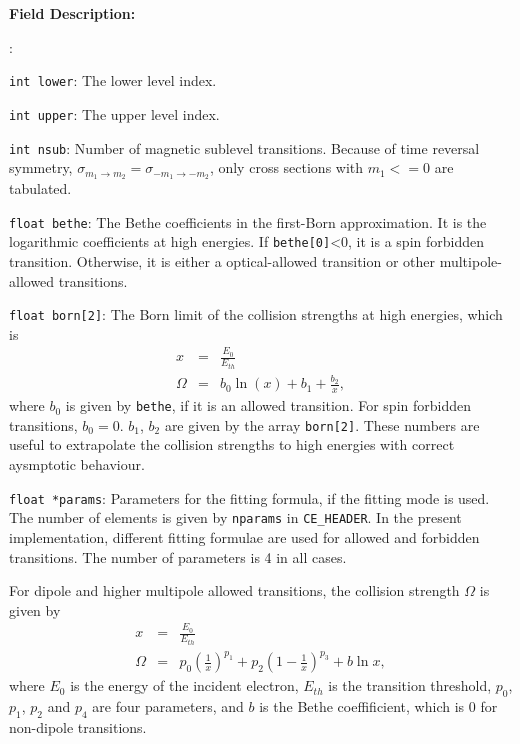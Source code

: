 \documentclass[twoside,letterpaper]{refrep}
\newenvironment{dbdesc}{\textbf{Field Description:} \begin{list}
	{:}{\setlength{\labelwidth}{2in}
	   \setlength{\leftmargin}{2in}
	   \setlength{\labelsep}{0.1in}
	   \setlength{\rightmargin}{0.2in}}}
	{\end{list}}
\begin{document}
\begin{dbdesc}
\item[\texttt{int lower}:] The lower level index.
\item[\texttt{int upper}:] The upper level index.
\item[\texttt{int nsub}:] Number of magnetic sublevel transitions. Because of
time reversal symmetry, $\sigma_{m_1\to m_2}=\sigma_{-m_1\to -m_2}$, only cross
sections with $m_1 <= 0$ are tabulated.
\item[\texttt{float bethe}:] The Bethe coefficients in the first-Born
approximation. It is the logarithmic coefficients at high energies. If
\texttt{bethe[0]}<0, it is a spin forbidden transition. Otherwise, it is
either a optical-allowed transition or other multipole-allowed transitions.
\item[\texttt{float born[2]}:] The Born limit of the collision strengths at
high energies, which is
\begin{eqnarray}
x &=& \frac{E_0}{E_{th}} \nonumber\\
\Omega &=& b_0\ln(x) + b_1 + \frac{b_2}{x},
\end{eqnarray}
where $b_0$ is given by \texttt{bethe}, if it is an allowed transition. For
spin forbidden transitions, $b_0 = 0$. $b_1$, $b_2$ are given by the array
\texttt{born[2]}. These numbers are useful to extrapolate the collision
strengths to high energies with correct aysmptotic behaviour.
\item[\texttt{float *params}:] Parameters for the fitting formula, if the
fitting mode is used. The number of elements is given by \texttt{nparams} in
\texttt{CE\_HEADER}. In the present implementation, different fitting formulae
are used for allowed and forbidden transitions. The number of parameters is 4
in all cases. 

For dipole and higher multipole allowed transitions, the
collision strength $\Omega$ is given by
\begin{eqnarray}
x &=& \frac{E_0}{E_{th}} \nonumber\\
\Omega &=& p_0\left(\frac{1}{x}\right)^{p_1} + 
p_2\left(1-\frac{1}{x}\right)^{p_3} + b\ln x,
\end{eqnarray}
where $E_0$ is the energy of the incident electron, $E_{th}$ is the transition
threshold, $p_0$, $p_1$, $p_2$ and $p_4$ are four parameters, and $b$ is the
Bethe coeffificient, which is 0 for non-dipole transitions.


\end{dbdesc}
\end{document}
